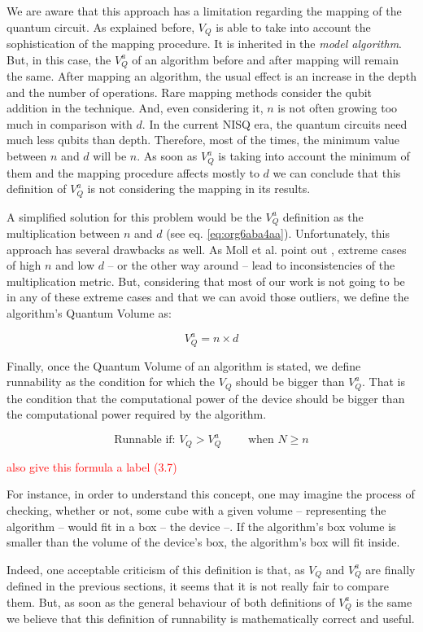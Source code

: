We are aware that this approach has a limitation regarding the mapping of the quantum circuit.
As explained before, \(V_Q\) is able to take into account the sophistication of the mapping procedure.
It is inherited in the \emph{model algorithm}.
But, in this case, the \(V^a_Q\) of an algorithm before and after mapping will remain the same.
After mapping an algorithm, the usual effect is an increase in the depth and the number of operations.
Rare mapping methods consider the qubit addition in the technique.
And, even considering it, \(n\) is not often growing too much in comparison with \(d\).
In the current NISQ era, the quantum circuits need much less qubits than depth.
Therefore, most of the times, the minimum value between \(n\) and \(d\) will be \(n\).
As soon as \(V^a_Q\) is taking into account the minimum of them and the mapping procedure affects mostly to \(d\) we can conclude that this definition of \(V^a_Q\) is not considering the mapping in its results.

A simplified solution for this problem would be the \(V^a_Q\) definition as the multiplication between \(n\) and \(d\) (see eq. \ref{eq:org6aba4aa}).
Unfortunately, this approach has several drawbacks as well.
As Moll et al. point out \cite{Moll_2018}, extreme cases of high \(n\) and low \(d\) -- or the other way around -- lead to inconsistencies of the multiplication metric.
But, considering that most of our work is not going to be in any of these extreme cases and that we can avoid those outliers, we define the algorithm's Quantum Volume as:

\begin{equation}
\label{eq:org6aba4aa}
V_Q^a =  n \times d
\end{equation}

Finally, once the Quantum Volume of an algorithm is stated, we define runnability as the condition for which the \(V_Q\) should be bigger than \(V^a_Q\).
That is the condition that the computational power of the device should be bigger than the computational power required by the algorithm.

$$\text{Runnable if: } V_Q > V^a_Q \quad \quad \text{ when } N \ge n$$

\textcolor{red}{also give this formula a label (3.7)}

For instance, in order to understand this concept, one may imagine the process of checking, whether or not, some cube with a given volume -- representing the algorithm -- would fit in a box -- the device --.
If the algorithm's box volume is smaller than the volume of the device's box, the algorithm's box will fit inside.

Indeed, one acceptable criticism of this definition is that, as \(V_Q\) and \(V^a_Q\) are finally defined in the previous sections, it seems that it is not really fair to compare them.
But, as soon as the general behaviour of both definitions of \(V^a_Q\) is the same we believe that this definition of runnability is mathematically correct and useful.

